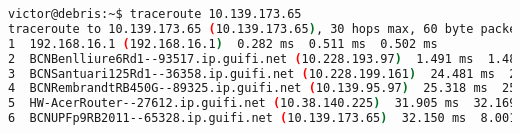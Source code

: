 \begin{lstlisting}[language=bash, caption={Route from a Guifi.net client finding a better path to UPF's node.}]
victor@debris:~$ traceroute 10.139.173.65
traceroute to 10.139.173.65 (10.139.173.65), 30 hops max, 60 byte packets
1  192.168.16.1 (192.168.16.1)  0.282 ms  0.511 ms  0.502 ms
2  BCNBenlliure6Rd1--93517.ip.guifi.net (10.228.193.97)  1.491 ms  1.485 ms  1.475 ms
3  BCNSantuari125Rd1--36358.ip.guifi.net (10.228.199.161)  24.481 ms  25.330 ms  25.327 ms
4  BCNRembrandtRB450G--89325.ip.guifi.net (10.139.95.97)  25.318 ms  25.308 ms  25.545 ms
5  HW-AcerRouter--27612.ip.guifi.net (10.38.140.225)  31.905 ms  32.169 ms  32.160 ms
6  BCNUPFp9RB2011--65328.ip.guifi.net (10.139.173.65)  32.150 ms  8.001 ms  7.739 ms
\end{lstlisting}
